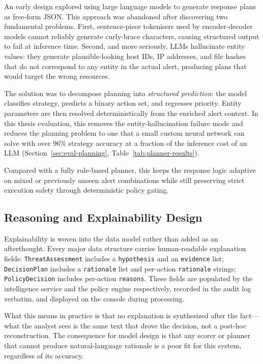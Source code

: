 An early design explored using large language models to generate response plans as
free-form JSON. This approach was abandoned after discovering two fundamental problems.
First, sentence-piece tokenisers used by encoder-decoder models cannot reliably generate
curly-brace characters, causing structured output to fail at inference time. Second, and
more seriously, LLMs hallucinate entity values: they generate plausible-looking host IDs,
IP addresses, and file hashes that do not correspond to any entity in the actual alert,
producing plans that would target the wrong resources.

The solution was to decompose planning into \textit{structured prediction}: the model
classifies strategy, predicts a binary action set, and regresses priority. Entity
parameters are then resolved deterministically from the enriched alert context. In this
thesis evaluation, this removes the entity-hallucination failure mode and reduces the
planning problem to one that a small custom neural network can solve with over 96\%
strategy accuracy at a fraction of the inference cost of an LLM (Section~\ref{sec:eval-planning},
Table~\ref{tab:planner-results}).

Compared with a fully rule-based planner, this keeps the response logic adaptive on
mixed or previously unseen alert combinations while still preserving strict execution
safety through deterministic policy gating.

\subsection{Reasoning and Explainability Design}

Explainability is woven into the data model rather than added as an afterthought.
Every major data structure carries human-readable explanation fields:
\texttt{ThreatAssessment} includes a \texttt{hypothesis} and an \texttt{evidence} list;
\texttt{DecisionPlan} includes a \texttt{rationale} list and per-action \texttt{rationale}
strings; \texttt{PolicyDecision} includes per-action \texttt{reasons}. These fields are
populated by the intelligence service and the policy engine respectively, recorded in
the audit log verbatim, and displayed on the console during processing.

What this means in practice is that no explanation is synthesized after the fact---what
the analyst sees is the same text that drove the decision, not a post-hoc reconstruction.
The consequence for model design is that any scorer or planner that cannot produce
natural-language rationale is a poor fit for this system, regardless of its accuracy.

